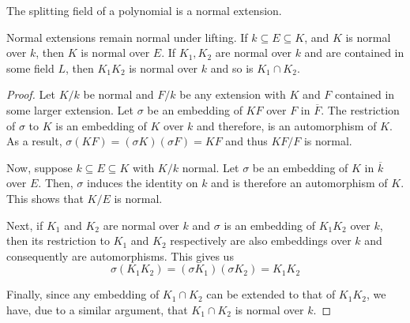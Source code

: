 \begin{corollary}
    The splitting field of a polynomial is a normal extension.
\end{corollary}

\begin{theorem}
    Normal extensions remain normal under lifting. If $k\subseteq E\subseteq K$, and $K$ is normal over $k$, then $K$ is normal over $E$. If $K_1,K_2$ are normal over $k$ and are contained in some field $L$, then $K_1K_2$ is normal over $k$ and so is $K_1\cap K_2$.
\end{theorem}
\begin{proof}
    Let $K/k$ be normal and $F/k$ be any extension with $K$ and $F$ contained in some larger extension. Let $\sigma$ be an embedding of $KF$ over $F$ in $\overline{F}$. The restriction of $\sigma$ to $K$ is an embedding of $K$ over $k$ and therefore, is an automorphism of $K$. As a result, $\sigma(KF) = (\sigma K)(\sigma F) = KF$ and thus $KF/F$ is normal.

    Now, suppose $k\subseteq E\subseteq K$ with $K/k$ normal. Let $\sigma$ be an embedding of $K$ in $\overline{k}$ over $E$. Then, $\sigma$ induces the identity on $k$ and is therefore an automorphism of $K$. This shows that $K/E$ is normal.

    Next, if $K_1$ and $K_2$ are normal over $k$ and $\sigma$ is an embedding of $K_1K_2$ over $k$, then its restriction to $K_1$ and $K_2$ respectively are also embeddings over $k$ and consequently are automorphisms. This gives us 
    \begin{equation*}
        \sigma(K_1K_2) = (\sigma K_1)(\sigma K_2) = K_1K_2
    \end{equation*}

    Finally, since any embedding of $K_1\cap K_2$ can be extended to that of $K_1K_2$, we have, due to a similar argument, that $K_1\cap K_2$ is normal over $k$.
\end{proof}